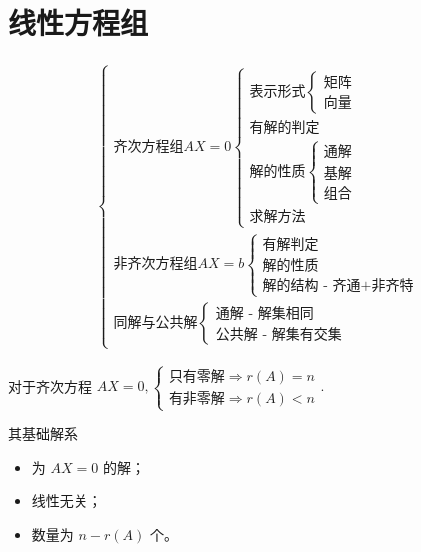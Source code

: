 \chapter{线性方程组}

\begin{equation*}
    \begin{aligned}
        \begin{cases}
            \textrm{齐次方程组} AX = 0\begin{cases}
                \textrm{表示形式}\begin{cases}
                    \textrm{矩阵}\\ \textrm{向量}
                \end{cases}\\ 
                \textrm{有解的判定}\\ 
                \textrm{解的性质}\begin{cases}
                    \textrm{通解}\\ \textrm{基解}\\ \textrm{组合}
                \end{cases}\\ 
                \textrm{求解方法}
            \end{cases}\\ 
            \textrm{非齐次方程组} AX = b\begin{cases}
                \textrm{有解判定} \\ \textrm{解的性质} \\ \textrm{解的结构 - 齐通+非齐特}
            \end{cases}\\ 
            \textrm{同解与公共解}\begin{cases}
                \textrm{通解 - 解集相同}\\ \textrm{公共解 - 解集有交集}
            \end{cases}
        \end{cases}
    \end{aligned}
\end{equation*}


对于齐次方程 $ AX = 0, \begin{cases}
    \textrm{只有零解}\Rightarrow r(A) = n\\ 
    \textrm{有非零解}\Rightarrow r(A) < n
\end{cases}. $ 

其基础解系
\begin{itemize}
    \item 为 $ AX = 0 $ 的解；
    \item 线性无关；
    \item 数量为 $ n - r(A) $ 个。
\end{itemize}

